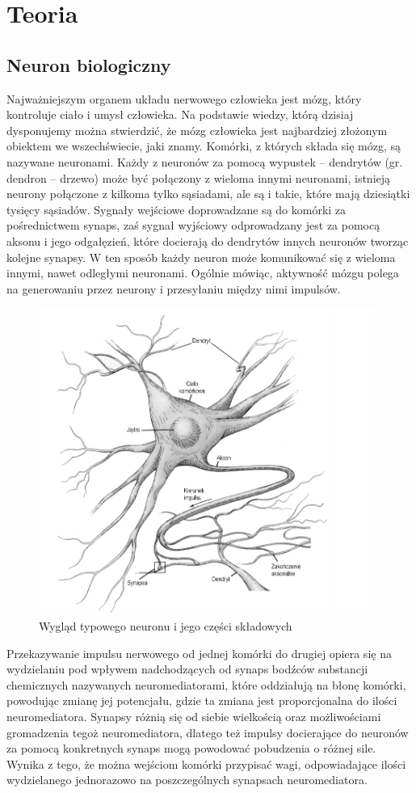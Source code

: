 \documentclass[a4paper, 12pt]{article}
\begin{document}
\section{Teoria}

\subsection{Neuron biologiczny}
Najważniejszym organem układu nerwowego człowieka jest mózg, który kontroluje ciało i umysł człowieka. Na podstawie wiedzy, którą dzisiaj dysponujemy można stwierdzić, że mózg
człowieka jest najbardziej złożonym obiektem we wszechświecie, jaki znamy. Komórki, z których składa się mózg, są nazywane neuronami. Każdy z neuronów za pomocą wypustek – dendrytów (gr. dendron – drzewo) może być połączony z wieloma innymi neuronami, istnieją neurony połączone z kilkoma tylko sąsiadami, ale są i takie, które mają dziesiątki tysięcy sąsiadów. Sygnały wejściowe doprowadzane są do komórki za pośrednictwem synaps, zaś sygnał wyjściowy odprowadzany jest za pomocą aksonu i jego odgałęzień, które docierają do dendrytów innych neuronów tworząc kolejne synapsy. W ten sposób każdy neuron może komunikować się z wieloma innymi, nawet odległymi neuronami. Ogólnie mówiąc, aktywność mózgu polega na generowaniu przez neurony i przesyłaniu między nimi impulsów.

\begin{figure}[hbt!]
\includegraphics[width=11cm]{naturalny_neuron}
\centering
\caption{Wygląd typowego neuronu i jego części składowych\cite {book1}}
\end{figure}
\newpage
Przekazywanie impulsu nerwowego od jednej komórki do drugiej opiera się na wydzielaniu pod wpływem nadchodzących od synaps bodźców substancji chemicznych nazywanych neuromediatorami, które oddziałują na błonę komórki, powodując zmianę jej potencjału, gdzie ta zmiana jest proporcjonalna do ilości neuromediatora.
Synapsy różnią się od siebie wielkością oraz możliwościami gromadzenia tegoż neuromediatora, dlatego też impulsy docierające do neuronów za pomocą konkretnych synaps mogą powodować pobudzenia o różnej sile. Wynika z tego, że można wejściom komórki przypisać wagi, odpowiadające ilości wydzielanego jednorazowo na poszczególnych synapsach neuromediatora.\\
\end{document}
